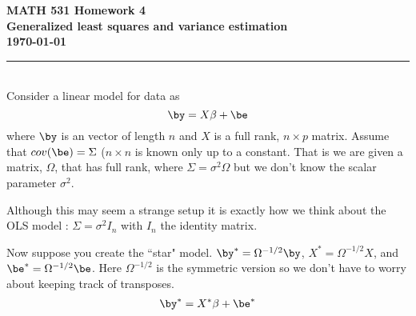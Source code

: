 \documentclass[11pt]{report}
\begin{document}
\vspace*{-1in}
\noindent
{\LARGE  \bf  \sc  MATH 531  Homework 4  \\
  }
\noindent
{\Large \bf   Generalized least squares and variance estimation  \\ \today} 
\ \\
{\color{orange3} \hrule  }
\ \\
   Consider a linear model for data as 
\[  \by = X \beta + \be \]
where $\by$ is an vector of length $n$ and $X$ is a full rank,
 $n\times p$ matrix. Assume that $cov(\be) = \Sigma$  ($ n \times n$ is known only up to a constant. 
 That is we are given  a matrix, $\Omega$, that has full rank, where  $\Sigma = \sigma^2\Omega$ but we don't know the scalar parameter $\sigma^2$. 
 
 Although this may seem a strange setup it is exactly how we think about the OLS model : $\Sigma = \sigma^2 I_n$ with $I_n$ the identity matrix.
 
 Now suppose you create the ``star" model. 
 $\by^* = \Omega^{-1/2}\by$, $X^* = \Omega^{-1/2}X$, and $\be^* = \Omega^{-1/2}\be$.
 Here  $\Omega^{-1/2}$ is the symmetric version so we don't have to worry about keeping track of transposes. 
  \[  \by^* = X^* \beta + \be^* \]
  
\end{document}
